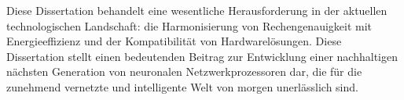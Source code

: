 \documentclass{article}
\begin{document}
Diese Dissertation behandelt eine wesentliche Herausforderung in der aktuellen technologischen Landschaft: die Harmonisierung von Rechengenauigkeit mit Energieeffizienz und der Kompatibilit\"at von Hardwarel\"osungen. Diese Dissertation stellt einen bedeutenden Beitrag zur Entwicklung einer nachhaltigen n\"achsten Generation von neuronalen Netzwerkprozessoren dar, die f\"ur die zunehmend vernetzte und intelligente Welt von morgen unerl\"asslich sind.
\end{document}
